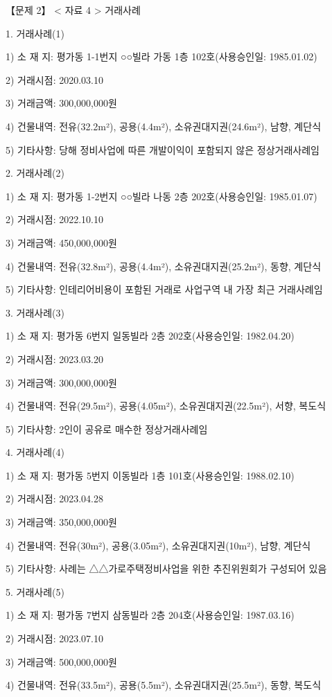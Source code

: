 \begin{longquestion}{【문제 2】}
< 자료 4 > 거래사례 \par
1. 거래사례(1) \par
1) 소 재 지: 평가동 1-1번지 ○○빌라 가동 1층 102호(사용승인일: 1985.01.02) \par
2) 거래시점: 2020.03.10 \par
3) 거래금액: 300,000,000원 \par
4) 건물내역: 전유(32.2m²), 공용(4.4m²), 소유권대지권(24.6m²), 남향, 계단식 \par
5) 기타사항: 당해 정비사업에 따른 개발이익이 포함되지 않은 정상거래사례임 \par
2. 거래사례(2) \par
1) 소 재 지: 평가동 1-2번지 ○○빌라 나동 2층 202호(사용승인일: 1985.01.07) \par
2) 거래시점: 2022.10.10 \par
3) 거래금액: 450,000,000원 \par
4) 건물내역: 전유(32.8m²), 공용(4.4m²), 소유권대지권(25.2m²), 동향, 계단식 \par
5) 기타사항: 인테리어비용이 포함된 거래로 사업구역 내 가장 최근 거래사례임 \par
3. 거래사례(3) \par
1) 소 재 지: 평가동 6번지 일동빌라 2층 202호(사용승인일: 1982.04.20) \par
2) 거래시점: 2023.03.20 \par
3) 거래금액: 300,000,000원 \par
4) 건물내역: 전유(29.5m²), 공용(4.05m²), 소유권대지권(22.5m²), 서향, 복도식 \par
5) 기타사항: 2인이 공유로 매수한 정상거래사례임 \par
4. 거래사례(4) \par
1) 소 재 지: 평가동 5번지 이동빌라 1층 101호(사용승인일: 1988.02.10) \par
2) 거래시점: 2023.04.28 \par
3) 거래금액: 350,000,000원 \par
4) 건물내역: 전유(30m²), 공용(3.05m²), 소유권대지권(10m²), 남향, 계단식 \par
5) 기타사항: 사례는 △△가로주택정비사업을 위한 추진위원회가 구성되어 있음 \par
5. 거래사례(5) \par
1) 소 재 지: 평가동 7번지 삼동빌라 2층 204호(사용승인일: 1987.03.16) \par
2) 거래시점: 2023.07.10 \par
3) 거래금액: 500,000,000원 \par
4) 건물내역: 전유(33.5m²), 공용(5.5m²), 소유권대지권(25.5m²), 동향, 복도식 \par

\end{longquestion}

